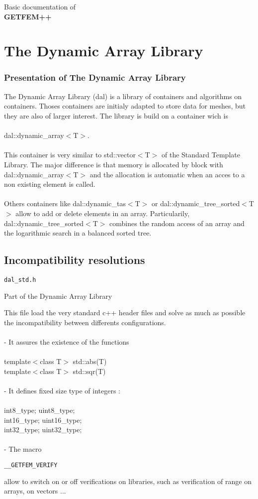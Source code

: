 \documentclass[10pt,a4paper]{doc}
\newenvironment{librarydescription}[1]
  { \part{#1} \setcounter{chapter}{0} \section*{Presentation of #1} }
  { }
\newenvironment{filedescription}[3]
  { \chapter{#2}
    {\LARGE \begin{alltt} \begin{center} #3 \end{center} \end{alltt}}
    {\large \begin{center} Part of the #1 \end{center} }
  }
  { }
\newcommand{\code}[1]{\begin{alltt}  #1 \end{alltt} }
\begin{document}
$\;$\\[3cm]\thispagestyle{empty}

{\begin{center} \Large Basic documentation of \\[2cm]

 \Huge \bf GETFEM++ \end{center}} \newpage

\tableofcontents

 \begin{librarydescription}{The Dynamic Array Library}
   The Dynamic Array Library (dal) is a library of containers
   and algorithms on containers. Thoses containers are initialy adapted
   to store data for meshes, but they are also of larger
   interest. The library is build on a container wich is \\ \\
   dal::dynamic\_array$<$T$>$. \\ \\
   This container is very similar to std::vector$<$T$>$ of the Standard
   Template Library. The major difference
   is that memory is allocated by block with dal::dynamic\_array$<$T$>$ and
   the allocation is automatic when an acces to a non existing element 
   is called. \\ \\
   Others containers like dal::dynamic\_tas$<$T$>$ or
   dal::dynamic\_tree\_sorted$<$T$>$ allow to add or delete elements
   in an array. Particularily, dal::dynamic\_tree\_sorted$<$T$>$ combines
   the random access of an array and the logarithmic search in a balanced
   sorted tree.
   \end{librarydescription}
   \begin{filedescription}{ Dynamic Array Library }{ Incompatibility resolutions }
        { dal\_std.h }
     This file load the very standard c++ header files and solve as much
     as possible the incompatibility between differents
     configurations. \\ \\
     - It assures the existence of the functions \\ \\
       template$<$class T$>$ std::abs(T) \\
       template$<$class T$>$ std::sqr(T) \\ \\
     - It defines fixed size type of integers : \\ \\
       int8\_type; uint8\_type; \\
       int16\_type; uint16\_type; \\
       int32\_type; uint32\_type; \\ \\
     - The macro
       \code{\_\_GETFEM\_VERIFY}
       allow to switch on or off verifications on libraries,
       such as verification of range on arrays, on vectors ...
    \end{filedescription} 
\end{document}

